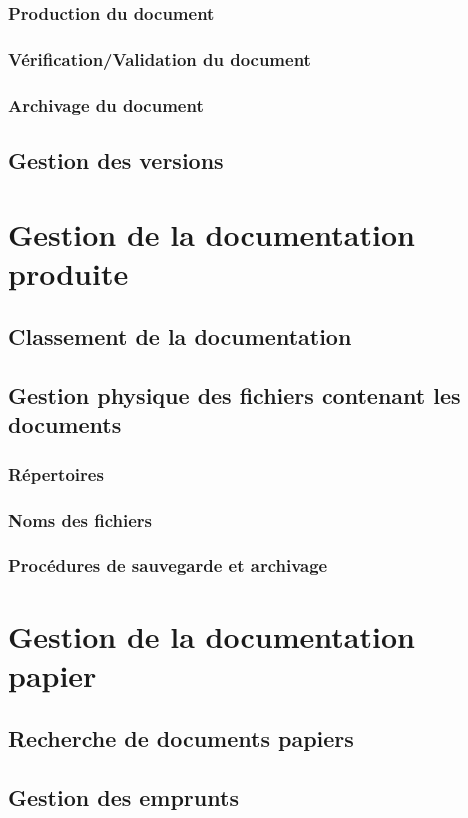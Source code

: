     \subsubsection{Production du document}
    \subsubsection{Vérification/Validation du document}
    \subsubsection{Archivage du document}
  \subsection{Gestion des versions}
\section{Gestion de la documentation produite}
  \subsection{Classement de la documentation}
  \subsection{Gestion physique des fichiers contenant les documents}     
    \subsubsection{Répertoires}
    \subsubsection{Noms des fichiers}
    \subsubsection{Procédures de sauvegarde et archivage}
\section{Gestion de la documentation papier}
  \subsection{Recherche de documents papiers}
  \subsection{Gestion des emprunts}
